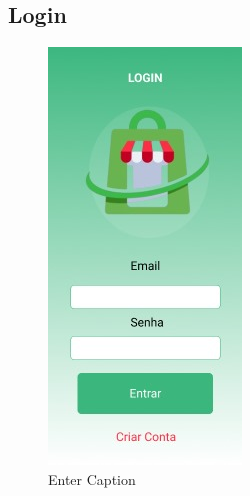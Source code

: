 \documentclass[12pt,oneside,a4paper,article]{abntex2}
\begin{document}
    \subsection{Login}
    \begin{figure}[H]
        \centering
        \includegraphics[width=0.5\linewidth]{imagens-template//telas/login.jpg}
        \caption{Enter Caption}
        \label{fig:placeholder}
    \end{figure}
    
\end{document}
